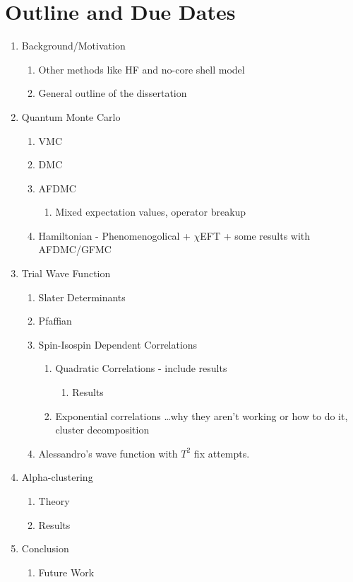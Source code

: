 {\small
\section*{Outline and Due Dates}
\begin{enumerate}
   \item Background/Motivation
   \begin{enumerate}
      \item Other methods like HF and no-core shell model
      \item General outline of the dissertation
   \end{enumerate}
   \item Quantum Monte Carlo
   \begin{enumerate}
      \item VMC
      \item DMC
      \item AFDMC
      \begin{enumerate}
         \item Mixed expectation values, operator breakup
      \end{enumerate}
      \item Hamiltonian - Phenomenogolical + $\chi$EFT + some results with AFDMC/GFMC
   \end{enumerate}
   \item Trial Wave Function
   \begin{enumerate}
      \item Slater Determinants
      \item Pfaffian
      \item Spin-Isospin Dependent Correlations
      \begin{enumerate}
         \item Quadratic Correlations - include results
         \begin{enumerate}
            \item Results
         \end{enumerate}
         \item Exponential correlations \ldots why they aren't working or how to do it, cluster decomposition
      \end{enumerate}
      \item Alessandro's wave function with $T^2$ fix attempts.
   \end{enumerate}
   \item Alpha-clustering
   \begin{enumerate}
      \item Theory
      \item Results
   \end{enumerate}
   \item Conclusion
   \begin{enumerate}
      \item Future Work
   \end{enumerate}
\end{enumerate}
}

